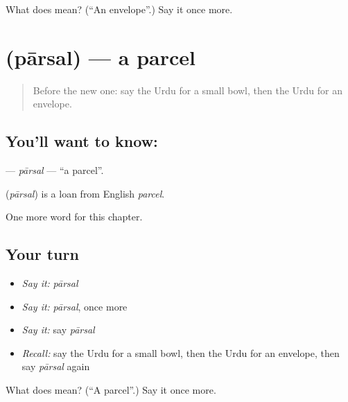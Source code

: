 \begin{tcolorbox}[breakable,colback=teal!4,colframe=teal!35!black,title={Before you move on}]
What does  mean? (\textquotedblleft{}An envelope\textquotedblright{}.) Say it once more.
\end{tcolorbox}
\section[\texorpdfstring{\ur{پارسل} (pārsal)}{پارسل (pārsal)}]{ (pārsal) — a parcel}

\label{lesson:UR-C225-parsal}



\begin{quote}
Before the new one: say the Urdu for a small bowl, then the Urdu for an envelope.
\end{quote}

\subsection*{You'll want to know: }
\textbf{} — \emph{pārsal} — \textquotedblleft{}a parcel\textquotedblright{}.

\begin{cousinweb}
\textbf{} (\emph{pārsal}) is a loan from English \emph{parcel}.
\end{cousinweb}

\begin{grammarlens}[title={What you've built}]
One more word for this chapter.
\end{grammarlens}

\subsection*{Your turn}
\begin{itemize}
\raggedright
  \item \emph{Say it:} \emph{pārsal}
  \item \emph{Say it:} \emph{pārsal}, once more
  \item \emph{Say it:} say \emph{pārsal}
  \item \emph{Recall:} say the Urdu for a small bowl, then the Urdu for an envelope, then say \emph{pārsal} again
\end{itemize}

\begin{tcolorbox}[breakable,colback=teal!4,colframe=teal!35!black,title={Before you move on}]
What does  mean? (\textquotedblleft{}A parcel\textquotedblright{}.) Say it once more.
\end{tcolorbox}
